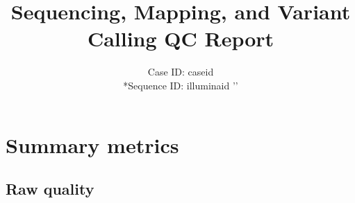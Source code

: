 \documentclass[a4paper,12pt]{scrartcl}
\begin{document}
\title{Sequencing, Mapping, and Variant Calling QC Report}
\subtitle{Case ID: {{ caseid }}\\*Sequence ID: {{illuminaid}}{{ '}' }}
\date{}
\author{}
\maketitle

\newpage

\section*{Summary metrics}

\subsection*{Raw quality}
\end{document}
